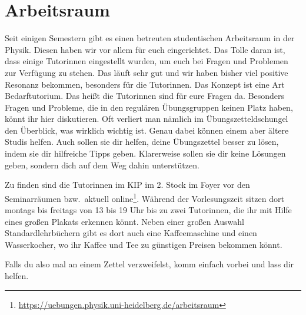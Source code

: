 \section{Arbeitsraum}
\label{sec:arbeitsraum}
Seit einigen Semestern gibt es einen betreuten studentischen Arbeitsraum in der Physik. Diesen haben wir vor allem für euch eingerichtet. Das Tolle daran ist, dass einige Tutorinnen eingestellt wurden, um euch bei Fragen und Problemen zur Verfügung zu stehen. Das läuft sehr gut und wir haben bisher viel positive Resonanz bekommen, besonders für die Tutorinnen. Das Konzept ist eine Art Bedarftutorium. Das heißt die Tutorinnen sind für eure Fragen da. Besonders Fragen und Probleme, die in den regulären Übungsgruppen keinen Platz haben, könnt ihr hier diskutieren. Oft verliert man nämlich im Übungszetteldschungel den Überblick, was wirklich wichtig ist. Genau dabei können einem aber ältere Studis helfen. Auch sollen sie dir helfen, deine Übungszettel besser zu lösen, indem sie dir hilfreiche Tipps geben. Klarerweise sollen sie dir keine Lösungen geben, sondern dich auf dem Weg dahin unterstützen.

Zu finden sind die Tutorinnen im \gls{KIP} im 2. Stock im Foyer vor den Seminarräumen bzw.\, aktuell online\footnote{\url{https://uebungen.physik.uni-heidelberg.de/arbeitsraum}}. Während der Vorlesungszeit sitzen dort montags bis freitags von 13 bis 19 Uhr bis zu zwei Tutorinnen, die ihr mit Hilfe eines großen Plakats erkennen könnt. Neben einer großen Auswahl Standardlehrbüchern gibt es dort auch eine Kaffeemaschine und einen Wasserkocher, wo ihr Kaffee und Tee zu günstigen Preisen bekommen könnt.

Falls du also mal an einem Zettel verzweifelst, komm einfach vorbei und lass dir helfen.
